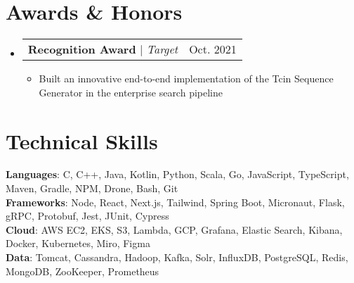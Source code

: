 \documentclass[letterpaper,11pt]{article}
\makeatletter
\newcommand{\resumeItem}[1]{
  \item\small{
    {#1 \vspace{-2pt}}
  }
}
\newcommand{\resumeProjectHeading}[2]{
    \item
    \begin{tabular*}{0.97\textwidth}{l@{\extracolsep{\fill}}r}
      \small#1 & #2 \\
    \end{tabular*}\vspace{-7pt}
}
\newcommand{\resumeSubHeadingListStart}{\begin{itemize}[leftmargin=0.15in, label={}]}
\newcommand{\resumeSubHeadingListEnd}{\end{itemize}}
\newcommand{\resumeItemListStart}{\begin{itemize}}
\newcommand{\resumeItemListEnd}{\end{itemize}\vspace{-5pt}}
\makeatother
\begin{document}
\section{Awards \& Honors}
    \resumeSubHeadingListStart
      \resumeProjectHeading
          {\textbf{Recognition Award} $|$ \emph{Target}}{Oct. 2021}
          \resumeItemListStart
            \resumeItem{Built an innovative end-to-end implementation of the Tcin Sequence Generator in the enterprise search pipeline}
          \resumeItemListEnd
    \resumeSubHeadingListEnd


\section{Technical Skills}
 \begin{itemize}[leftmargin=0.15in, label={}]
    \small{\item{
     \textbf{Languages}{: C, C++, Java, Kotlin, Python, Scala, Go, JavaScript, TypeScript, Maven, Gradle, NPM, Drone, Bash, Git} \\
     \textbf{Frameworks}{: Node, React, Next.js, Tailwind, Spring Boot, Micronaut, Flask, gRPC, Protobuf, Jest, JUnit, Cypress} \\
     \textbf{Cloud}{: AWS EC2, EKS, S3, Lambda, GCP, Grafana, Elastic Search, Kibana, Docker, Kubernetes, Miro, Figma} \\
     \textbf{Data}{: Tomcat, Cassandra, Hadoop, Kafka, Solr, InfluxDB, PostgreSQL, Redis, MongoDB, ZooKeeper, Prometheus}
    }}
 \end{itemize}


\end{document}
